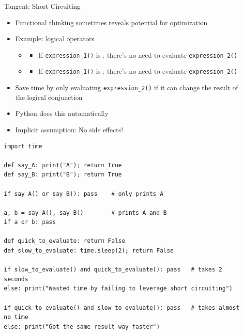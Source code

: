 \begin{frame}{Tangent: Short Circuiting}
%
\begin{itemize}
\item Functional thinking sometimes reveals potential for optimization
\item Example: logical operators
	\begin{itemize}
	\item {}
		\begin{itemize}
		\item If \texttt{expression\_1()} is , there's no need to evaluate \texttt{expression\_2()}
		\end{itemize}
	\item {}
		\begin{itemize}
		\item If \texttt{expression\_1()} is , there's no need to evaluate \texttt{expression\_2()}
		\end{itemize}
	\end{itemize}
\item[\Thus] Save time by only evaluating \texttt{expression\_2()} if it can change the result of the logical conjunction
\item[\Thus] Python does this automatically
\item[\Thus] Implicit assumption: No side effects!
\end{itemize}
%
\end{frame}


\begin{frame}[fragile]
%
\begin{codebox}
\begin{verbatim}
import time

def say_A: print("A"); return True
def say_B: print("B"); return True

if say_A() or say_B(): pass    # only prints A

a, b = say_A(), say_B()        # prints A and B
if a or b: pass

def quick_to_evaluate: return False
def slow_to_evaluate: time.sleep(2); return False

if slow_to_evaluate() and quick_to_evaluate(): pass   # takes 2 seconds
else: print("Wasted time by failing to leverage short circuiting")

if quick_to_evaluate() and slow_to_evaluate(): pass   # takes almost no time
else: print("Got the same result way faster")
\end{verbatim}
\end{codebox}
%
\end{frame}

